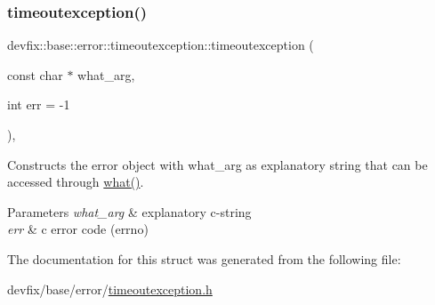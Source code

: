 \subsubsection{\texorpdfstring{timeoutexception()}{timeoutexception()}\hspace{0.1cm}{\footnotesize\ttfamily [2/2]}}
{\footnotesize\ttfamily devfix\+::base\+::error\+::timeoutexception\+::timeoutexception (\begin{DoxyParamCaption}\item[{const char $\ast$}]{what\+\_\+arg,  }\item[{int}]{err = {\ttfamily -\/1} }\end{DoxyParamCaption})\hspace{0.3cm}{\ttfamily [inline]}, {\ttfamily [explicit]}}

Constructs the error object with what\+\_\+arg as explanatory string that can be accessed through \hyperlink{structdevfix_1_1base_1_1error_1_1baseexception_a16327152a55d65b1e537825231fbd452}{what()}. 
\begin{DoxyParams}{Parameters}
{\em what\+\_\+arg} & explanatory c-\/string \\
\hline
{\em err} & c error code (errno) \\
\hline
\end{DoxyParams}


The documentation for this struct was generated from the following file\+:\begin{DoxyCompactItemize}
\item 
devfix/base/error/\hyperlink{timeoutexception_8h}{timeoutexception.\+h}\end{DoxyCompactItemize}
